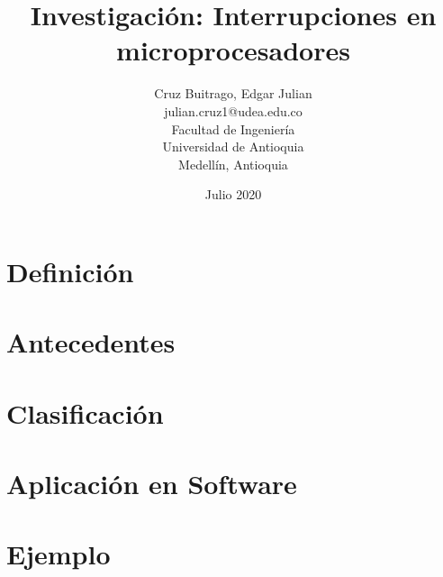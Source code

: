 \documentclass[]{article}
\title{Investigación: Interrupciones en microprocesadores}
\author{Cruz Buitrago, Edgar Julian \\ julian.cruz1@udea.edu.co \\ Facultad de Ingeniería \\ Universidad de Antioquia \\ Medellín, Antioquia}
\date{Julio 2020}
\begin{document}
\maketitle
\begin{multicols}{2}
	\begin{abstract}		
		
	\end{abstract}
	
	\section{Definición}
	\section{Antecedentes}
	\section{Clasificación}
	\section{Aplicación en Software}
	\section{Ejemplo}
\end{multicols}
\end{document}
